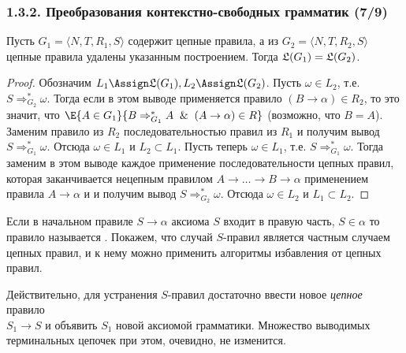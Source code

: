 \begin{frame}
\frametitle{1.3.2. Преобразования контекстно-свободных грамматик (7/9)}
\begin{theorem}
Пусть $G_1=\langle N, T, R_1, S\rangle$ 
содержит цепные правила, 
а из $G_2=\langle N, T, R_2, S\rangle$ 
цепные правила удалены указанным построением. 
Тогда $\frak{L}(G_1)=\frak{L}(G_2)$.
\end{theorem}

\begin{proof}
Обозначим $L_1\Assign\frak{L}(G_1), L_2\Assign\frak{L}(G_2)$. 
Пусть $\omega\in L_2$, т.е. $S\Rightarrow^*_{G_2} \omega$.
Тогда если в этом выводе применяется правило
$(B\to\alpha)\in R_2$, то это значит, что  
$\E{A\in G_1}{B\Rightarrow_{G_1}^* A \And (A\to\alpha)\in R}$ (возможно, что $B=A$). 
Заменим правило из $R_2$ последовательностью 
правил из $R_1$ и получим вывод 
$S\Rightarrow^*_{G_1} \omega$.
Отсюда $\omega\in L_1$ и $L_2\subset L_1$.
Пусть теперь $\omega\in L_1$, т.е. $S\Rightarrow^*_{G_1} \omega$.
Тогда заменим в этом выводе 
каждое применение 
последовательности цепных правил, которая заканчивается 
нецепным правилом
$A\to\dots\to B\to\alpha$ применением
правила 
$A\to\alpha$ и 
 и получим вывод 
$S\Rightarrow^*_{G_2} \omega$.
Отсюда $\omega\in L_2$ и $L_1\subset L_2$.
\end{proof}

\medskip
Если в начальном правиле $S \rightarrow \alpha$ аксиома 
$S$ входит в правую часть, $S\in \alpha$ то правило называется .
Покажем, что случай $S$-правил является частным случаем цепных правил, и к нему можно применить алгоритмы избавления от цепных правил.

Действительно, для устранения $S$-правил 
достаточно ввести новое {\em цепное}
правило \\$S_1\to S$ и объявить $S_1$ 
новой аксиомой грамматики. Множество 
выводимых терминальных цепочек 
при этом, очевидно, не изменится.
\end{frame}


